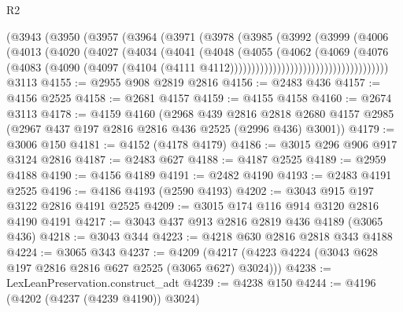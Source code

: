 \begin{lexlean}{R2}
\begin{coremodule}
                            (@3943
                              (@3950
                                (@3957
                                  (@3964
                                    (@3971
                                      (@3978
                                        (@3985
                                          (@3992
                                            (@3999
                                              (@4006
                                                (@4013
                                                  (@4020
                                                    (@4027
                                                      (@4034
                                                        (@4041
                                                          (@4048
                                                            (@4055
                                                              (@4062
                                                                (@4069
                                                                  (@4076
                                                                    (@4083
                                                                      (@4090
                                                                        (@4097
                                                                          (@4104
                                                                            (@4111
                                                                              @4112)))))))))))))))))))))))))))))))))))))
    @3113
@4155 := @2955 @908 @2819 @2816
@4156 := @2483 @436
@4157 := @4156 @2525
@4158 := @2681 @4157
@4159 := @4155 @4158
@4160 := @2674 @3113
@4178 := @4159
    @4160
    (@2968
      @439
      @2816
      @2818
      @2680
      @4157
      @2985
      (@2967 @437 @197 @2816 @2816 @436 @2525 (@2996 @436) @3001))
@4179 := @3006 @150
@4181 := @4152 (@4178 @4179)
@4186 := @3015 @296 @906 @917 @3124 @2816
@4187 := @2483 @627
@4188 := @4187 @2525
@4189 := @2959 @4188
@4190 := @4156 @4189
@4191 := @2482 @4190
@4193 := @2483 @4191 @2525
@4196 := @4186 @4193 (@2590 @4193)
@4202 := @3043 @915 @197 @3122 @2816 @4191 @2525
@4209 := @3015 @174 @116 @914 @3120 @2816 @4190 @4191
@4217 := @3043 @437 @913 @2816 @2819 @436 @4189 (@3065 @436)
@4218 := @3043 @344
@4223 := @4218 @630 @2816 @2818 @343 @4188
@4224 := @3065 @343
@4237 := @4209 (@4217 (@4223 @4224 (@3043 @628 @197 @2816 @2816 @627 @2525 (@3065 @627) @3024)))
@4238 := LexLeanPreservation.construct_adt
@4239 := @4238 @150
@4244 := @4196 (@4202 (@4237 (@4239 @4190)) @3024)

\end{coremodule}
\end{lexlean}
